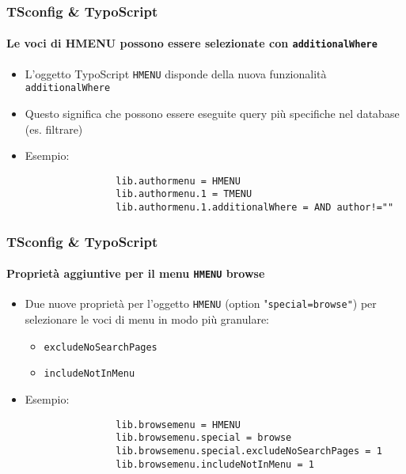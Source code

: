 \begin{frame}[fragile]
	\frametitle{TSconfig \& TypoScript}
	\framesubtitle{Le voci di HMENU possono essere selezionate con \texttt{additionalWhere}}

	\begin{itemize}

		\item L'oggetto TypoScript \texttt{HMENU} disponde della nuova funzionalità \texttt{additionalWhere}
		\item Questo significa che possono essere eseguite query più specifiche nel database (es. filtrare)

		\item Esempio:

			\begin{lstlisting}
				lib.authormenu = HMENU
				lib.authormenu.1 = TMENU
				lib.authormenu.1.additionalWhere = AND author!=""
			\end{lstlisting}

	\end{itemize}

\end{frame}


\begin{frame}[fragile]
	\frametitle{TSconfig \& TypoScript}
	\framesubtitle{Proprietà aggiuntive per il menu \texttt{HMENU} browse}

	\begin{itemize}
		\item Due nuove proprietà per l'oggetto \texttt{HMENU} (option "\texttt{special=browse"})\newline
			per selezionare le voci di menu in modo più granulare:
		
			\begin{itemize}
				\item \texttt{excludeNoSearchPages}
				\item \texttt{includeNotInMenu}
			\end{itemize}

		\item Esempio:

			\begin{lstlisting}
				lib.browsemenu = HMENU
				lib.browsemenu.special = browse
				lib.browsemenu.special.excludeNoSearchPages = 1
				lib.browsemenu.includeNotInMenu = 1
			\end{lstlisting}

	\end{itemize}

\end{frame}

